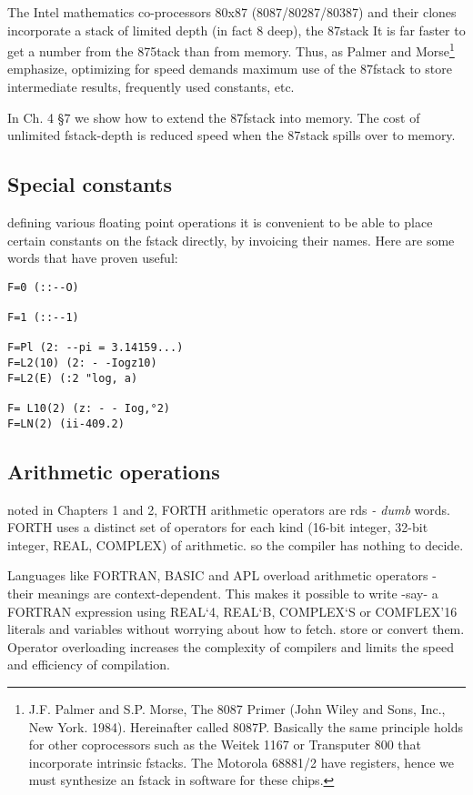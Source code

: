 The Intel mathematics co-processors 80x87 (8087/80287/80387)
and their clones incorporate a stack of limited depth (in fact 8
deep), the 87stack It is far faster to get a number from the 875tack
than from memory. Thus, as Palmer and Morse\footnote{J.F. Palmer and S.P.
Morse, The 8087 Primer (John Wiley and Sons, Inc., New York. 1984).
Hereinafter called 8087P. Basically the same principle holds for other
coprocessors such as the Weitek 1167 or Transputer 800 that incorporate
intrinsic fstacks. The Motorola 68881/2 have registers, hence we must
synthesize an fstack in software for these chips.} emphasize, optimizing for
speed demands maximum use of the 87fstack to store intermediate results,
frequently used constants, etc.

In Ch. 4 §7 we show how to extend the 87fstack into memory. The
cost of unlimited fstack-depth is reduced speed when the 87stack
spills over to memory.

\subsection{Special constants}
defining various floating point operations it is convenient to be
able to place certain constants on the fstack directly, by invoicing
their names. Here are some words that have proven useful:
\begin{verbatim}
F=0 (::--O)

F=1 (::--1)

F=Pl (2: --pi = 3.14159...)
F=L2(10) (2: - -Iogz10)
F=L2(E) (:2 "log, a)

F= L10(2) (z: - - Iog,°2)
F=LN(2) (ii-409.2)
\end{verbatim}
 
\subsection{Arithmetic operations}
noted in Chapters 1 and 2, FORTH arithmetic operators are
rds \textit{- dumb} words. FORTH uses a distinct set of operators
for each kind (16-bit integer, 32-bit integer, REAL, COMPLEX)
of arithmetic. so the compiler has nothing to decide.

Languages like FORTRAN, BASIC and APL overload arithmetic operators - their
meanings are context-dependent. This
makes it possible to write -say- a FORTRAN expression using
REAL‘4, REAL‘B, COMPLEX‘S or COMFLEX’16 literals
and variables without worrying about how to fetch. store or
convert them. Operator overloading increases the complexity of
compilers and limits the speed and efficiency of compilation.

